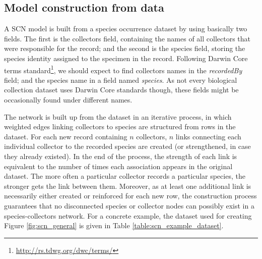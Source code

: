 {  
\subsection{Model construction from data}
A SCN model is built from a species occurrence dataset by using basically two fields.
The first is the collectors field, containing the names of all collectors that were responsible for the record; and the second is the species field, storing the species identity assigned to the specimen in the record.
Following Darwin Core terms standard\footnote{\url{http://rs.tdwg.org/dwc/terms/}}, we should expect to find collectors names in the \textit{recordedBy} field; and the species name in a field named \textit{species}. As not every biological collection dataset uses Darwin Core standards though, these fields might be occasionally found under different names.

The network is built up from the dataset in an iterative process, in which weighted edges linking collectors to species are structured from rows in the dataset.
For each new record containing $n$ collectors, $n$ links connecting each individual collector to the recorded species are created (or strengthened, in case they already existed).
In the end of the process, the strength of each link is equivalent to the number of times each association appears in the original dataset.
The more often a particular collector records a particular species, the stronger gets the link between them.
Moreover, as at least one additional link is necessarily either created or reinforced for each new row, the construction process guarantees that no disconnected species or collector nodes can possibly exist in a species-collectors network.
For a concrete example, the dataset used for creating Figure \ref{fig:scn_general} is given in Table \ref{table:scn_example_dataset}.

}
